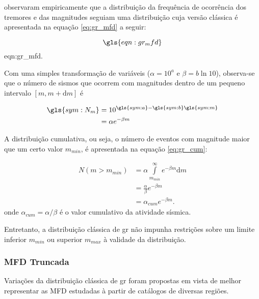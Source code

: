 \citet{gutenberg_1944} observaram empiricamente que a distribuição da frequência de ocorrência dos tremores e
das magnitudes seguiam uma distribuição cuja versão clássica é apresentada na equação \eqref{eq:gr_mfd} a seguir:

\begin{equation}
	\gls{eqn:gr_mfd}
	\label{eq:gr_mfd}
\end{equation}
\glsdesc*{eqn:gr_mfd}.

Com uma simples transformação de variáveis ($\alpha = 10^a$ e $\beta = b\ln{10}$), observa-se que o número de sismos que ocorrem 
com magnitudes dentro de um pequeno intervalo $[m, m+\mathrm{d}m]$ é

\begin{equation}
	\begin{split}
		\gls{sym:N_m} &= 10^{\gls{sym:a} - \gls{sym:b}\gls{sym:m}} \\
					  &= \alpha e^{-\beta m}
	\end{split}
	\label{eq:gr_exp}
\end{equation}

A distribuição cumulativa, ou seja, o número de eventos com magnitude maior que um certo valor $m_{min}$, é apresentada
na equação \eqref{eq:gr_cum}:

\begin{equation}
	\begin{split}
		N(m > m_{min}) &= \alpha \int\limits_{m_{min}}^{\infty}e^{-\beta m}\mathrm{d}m \\
					   &= \frac{\alpha}{\beta} e^{-\beta m} \\
					   &= \alpha_{cum} e^{-\beta m}.
	\end{split}
	\label{eq:gr_cum}
\end{equation}
onde $\alpha_{cum} = \alpha / \beta $ é o valor cumulativo da atividade sísmica.


Entretanto, a distribuição clássica de \gls{gr} não impunha restrições sobre um limite inferior $m_{min}$ 
ou superior $m_{max}$ à validade da distribuição.



\subsubsection{MFD Truncada}
\label{sec:TMFD}

Variações da distribuição clássica de \gls{gr} foram propostas em vista de melhor representar as MFD estudadas à partir de
catálogos de diversas regiões.

